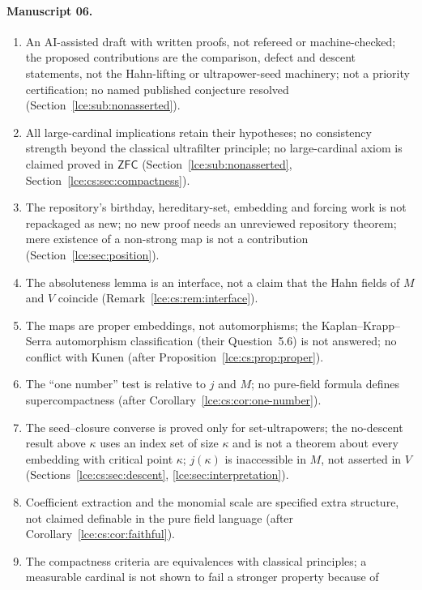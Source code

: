 \documentclass[11pt,letterpaper]{article}
\numberwithin{equation}{section}
\theoremstyle{definition}
\theoremstyle{remark}
\newcommand{\ZFC}{\mathsf{ZFC}}
\newcommand{\prref}[1]{Proposition~\ref{#1}}
\begin{document}
\paragraph{Manuscript 06.}
\begin{enumerate}[label=06.\arabic*]
\item An AI-assisted draft with written proofs, not refereed or
machine-checked; the proposed contributions are the comparison, defect and
descent statements, not the Hahn-lifting or ultrapower-seed machinery; not a
priority certification; no named published conjecture resolved
(Section~\ref{lce:sub:nonasserted}).
\item All large-cardinal implications retain their hypotheses; no
consistency strength beyond the classical ultrafilter principle; no
large-cardinal axiom is claimed proved in $\ZFC$ (Section~\ref{lce:sub:nonasserted},
Section~\ref{lce:cs:sec:compactness}).
\item The repository's birthday, hereditary-set, embedding and forcing work
is not repackaged as new; no new proof needs an unreviewed repository
theorem; mere existence of a non-strong map is not a contribution
(Section~\ref{lce:sec:position}).
\item The absoluteness lemma is an interface, not a claim that the Hahn
fields of $M$ and $V$ coincide (Remark~\ref{lce:cs:rem:interface}).
\item The maps are proper embeddings, not automorphisms; the
Kaplan--Krapp--Serra automorphism classification (their Question~5.6) is
not answered; no conflict with Kunen (after \prref{lce:cs:prop:proper}).
\item The ``one number'' test is relative to $j$ and $M$; no pure-field
formula defines supercompactness (after
Corollary~\ref{lce:cs:cor:one-number}).
\item The seed--closure converse is proved only for set-ultrapowers; the
no-descent result above $\kappa$ uses an index set of size $\kappa$ and is
not a theorem about every embedding with critical point $\kappa$; $j(\kappa)$
is inaccessible in $M$, not asserted in $V$
(Sections~\ref{lce:cs:sec:descent}, \ref{lce:sec:interpretation}).
\item Coefficient extraction and the monomial scale are specified extra
structure, not claimed definable in the pure field language (after
Corollary~\ref{lce:cs:cor:faithful}).
\item The compactness criteria are equivalences with classical principles;
a measurable cardinal is not shown to fail a stronger property because of

\end{enumerate}
\end{document}
